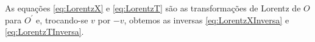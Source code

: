 As equações \eqref{eq:LorentzX} e \eqref{eq:LorentzT} são as transformações de Lorentz de $O$ para $O^\prime$ e, trocando-se $v$ por $-v$, obtemos as inversas \eqref{eq:LorentzXInversa} e \eqref{eq:LorentzTInversa}.


